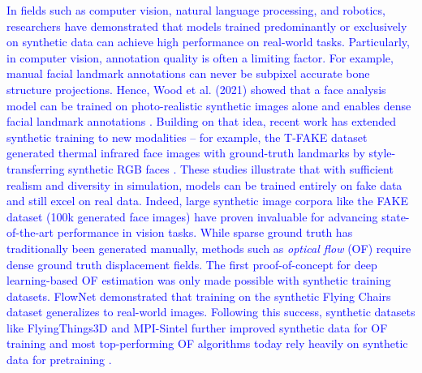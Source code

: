 \documentclass{article}
\newcommand{\phflo}[1]{\textcolor{blue}{#1}}
\begin{document}
\phflo{In fields such as computer vision, natural language processing, and robotics, researchers have demonstrated that models trained predominantly or exclusively on synthetic data can achieve high performance on real-world tasks. Particularly, in computer vision, annotation quality is often a limiting factor. For example, manual facial landmark annotations can never be subpixel accurate bone structure projections. Hence, Wood et al. (2021) showed that a face analysis model can be trained on photo-realistic synthetic images alone and enables dense facial landmark annotations \cite{wood2021fake}. Building on that idea, recent work has extended synthetic training to new modalities -- for example, the T-FAKE dataset generated thermal infrared face images with ground-truth landmarks by style-transferring synthetic RGB faces \cite{flotho2024t}. These studies illustrate that with sufficient realism and diversity in simulation, models can be trained entirely on fake data and still excel on real data. Indeed, large synthetic image corpora like the FAKE dataset (100k generated face images) have proven invaluable for advancing state-of-the-art performance in vision tasks. 
While sparse ground truth has traditionally been generated manually, methods such as \textit{optical flow} (OF) require dense ground truth displacement fields. The first proof-of-concept for deep learning-based OF estimation was only made possible with synthetic training datasets. FlowNet demonstrated that training on the synthetic Flying Chairs dataset generalizes to real-world images.
Following this success, synthetic datasets like FlyingThings3D \cite{Mayer_2016_CVPR} and MPI-Sintel \cite{ButlerWSB12} further improved synthetic data for OF training and most top-performing OF algorithms today rely heavily on synthetic data for pretraining \cite{teed2020raft}.}
\end{document}
